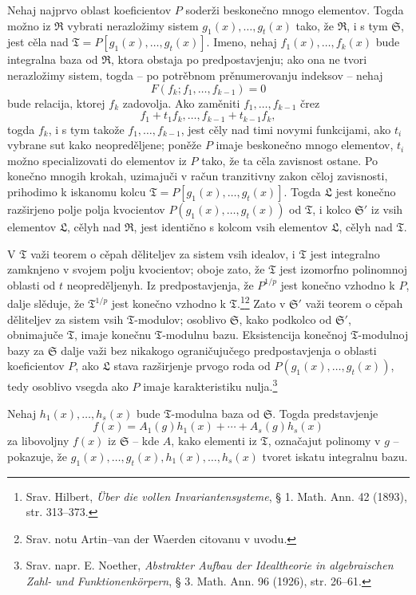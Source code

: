 \documentclass[11pt]{article}
\begin{document}
Nehaj najprvo oblast koeficientov $P$ soderži beskonečno mnogo elementov. Togda možno iz $\mathfrak R$ vybrati nerazložimy sistem $g_1(x),\ldots,g_t(x)$ tako, že $\mathfrak R$, i s tym $\mathfrak S$, jest cěla nad $\mathfrak T=P[g_1(x),\ldots,g_t(x)]$. Imeno, nehaj $f_1(x),\ldots,f_k(x)$ bude integralna baza od $\mathfrak R$, ktora obstaja po predpostavjenju; ako ona ne tvori nerazložimy sistem, togda -- po potrěbnom prěnumerovanju indeksov -- nehaj
\[
F(f_k;f_1,\ldots,f_{k-1})=0
\]
bude relacija, ktorej $f_k$ zadovolja. Ako zaměniti $f_1,\ldots,f_{k-1}$ črez
\[
 f_1+t_1f_k,\ldots,f_{k-1}+t_{k-1}f_k,
\]
togda $f_k$, i s tym takože $f_1,\ldots,f_{k-1}$, jest cěly nad timi novymi funkcijami, ako $t_i$ vybrane sut kako neopreděljene; poněže $P$ imaje beskonečno mnogo elementov, $t_i$ možno specializovati do elementov iz $P$ tako, že ta cěla zavisnost ostane. Po konečno mnogih krokah, uzimajuči v račun tranzitivny zakon cěloj zavisnosti, prihodimo k iskanomu kolcu $\mathfrak T=P[g_1(x),\ldots,g_t(x)]$. Togda $\mathfrak L$ jest konečno razširjeno polje polja kvocientov $P(g_1(x),\ldots,g_t(x))$ od $\mathfrak T$, i kolco $\mathfrak S'$ iz vsih elementov $\mathfrak L$, cělyh nad $\mathfrak R$, jest identično s kolcom vsih elementov $\mathfrak L$, cělyh nad $\mathfrak T$.

V $\mathfrak T$ važi teorem o cěpah děliteljev za sistem vsih idealov, i $\mathfrak T$ jest integralno zamknjeno v svojem polju kvocientov; oboje zato, že $\mathfrak T$ jest izomorfno polinomnoj oblasti od $t$ neopreděljenyh. Iz predpostavjenja, že $P^{1/p}$ jest konečno vzhodno k $P$, dalje slěduje, že $\mathfrak T^{1/p}$ jest konečno vzhodno k $\mathfrak T$.\footnote{Srav. Hilbert, \emph{Über die vollen Invariantensysteme}, § 1. Math. Ann. 42 (1893), str. 313--373.}\footnote{Srav. notu Artin--van der Waerden citovanu v uvodu.} Zato v $\mathfrak S'$ važi teorem o cěpah děliteljev za sistem vsih $\mathfrak T$-modulov; osoblivo $\mathfrak S$, kako podkolco od $\mathfrak S'$, obnimajuče $\mathfrak T$, imaje konečnu $\mathfrak T$-modulnu bazu. Eksistencija konečnoj $\mathfrak T$-modulnoj bazy za $\mathfrak S$ dalje važi bez nikakogo ograničujučego predpostavjenja o oblasti koeficientov $P$, ako $\mathfrak L$ stava razširjenje prvogo roda od $P(g_1(x),\ldots,g_t(x))$, tedy osoblivo vsegda ako $P$ imaje karakteristiku nulja.\footnote{Srav. napr. E. Noether, \emph{Abstrakter Aufbau der Idealtheorie in algebraischen Zahl- und Funktionenkörpern}, § 3. Math. Ann. 96 (1926), str. 26--61.}

Nehaj $h_1(x),\ldots,h_s(x)$ bude $\mathfrak T$-modulna baza od $\mathfrak S$. Togda predstavjenje
\[
 f(x)=A_1(g)h_1(x)+\cdots+A_s(g)h_s(x)
\]
za libovoljny $f(x)$ iz $\mathfrak S$ -- kde $A$, kako elementi iz $\mathfrak T$, označajut polinomy v $g$ -- pokazuje, že $g_1(x),\ldots,g_t(x),h_1(x),\ldots,h_s(x)$ tvoret iskatu integralnu bazu.
\end{document}
